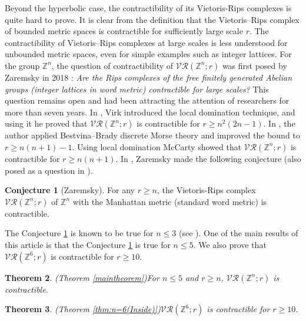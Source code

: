 \documentclass{amsart}
\newtheorem{theorem}{Theorem}[section]
\theoremstyle{definition}
\newtheorem{conj}[theorem]{Conjecture}
\theoremstyle{remark}
\numberwithin{equation}{section}
\newcommand{\vr}[2]{\mathcal{VR}(#1;#2)}
\def\Z{{\mathbb{Z}}}
\begin{document}
Beyond the hyperbolic case, the contractibility of its Vietoris-Rips complexes is quite hard to prove.  It is clear from the definition that the Vietoris–Rips complex of bounded metric spaces is contractible for sufficiently large scale $r$. The contractibility of Vietoris–Rips complexes at large scales is less understood for unbounded metric spaces, even for simple examples such as integer lattices. For the  group $\Z^n$, the question of contractibility of $\vr{\Z^n}{r}$ was first posed by Zaremsky  in 2018 \cite{Zaremsky2022}: {\it  Are the Rips complexes of the
	free finitely generated Abelian groups (integer lattices in word metric)
	contractible for large scales?} This question remains open and had been attracting the attention of researchers for more than seven years. In \cite{Virk2025}, Virk introduced the local domination technique, and using it he proved that $\vr{\Z^n}{r}$ is contractible for $r \geq n^2(2n-1)$. In \cite{Zaremsky2025}, the author applied Bestvina--Brady discrete Morse theory and improved the bound to $r \geq n(n+1)-1$. Using local domination McCarty \cite[Theorem 3.1]{McCarty2025}  showed that $\vr{\Z^n}{r}$ is contractible for $ r \geq n(n+1)$.   In \cite{Zaremsky2025}, Zaremsky made the following conjecture (also posed as a question in \cite[Section 6]{Virk2025}). 

\begin{conj}[Zaremsky]\label{conj:main}
	For any $ r\geq n$, the Vietoris-Rips complex $\vr{\mathbb{Z}^n}{r}$ of $\Z^n$ with the Manhattan metric (standard word metric)  is contractible.  
\end{conj}


The Conjecture \ref{conj:main} is known to be true for $n \leq 3$ (see \cite{Virk2025, Wang2024}). One of the main results of this article is that the Conjecture \ref{conj:main} is true for $n \leq 5$. We also prove that $\vr{\Z^6}{r}$ is contractible for $r \geq 10$.

\begin{theorem} {\rm (Theorem \ref{maintheorem})}\label{thm:n<=5}
	For $n \leq 5$ and $r \geq n$, $\vr{\Z^n}{r}$ is contractible. 
\end{theorem}



\begin{theorem}{\rm (Theorem \ref{thm:n=6(Inside)})}\label{thm:n=6}
	$\vr{\Z^6}{r}$ is contractible for $r \geq 10$.
\end{theorem}
\end{document}

